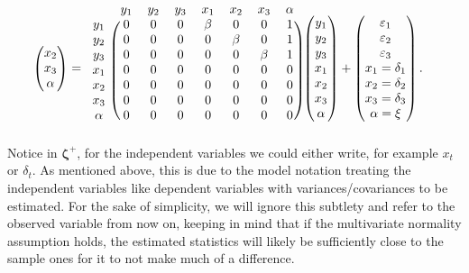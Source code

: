 \documentclass[
  12pt,
  a4paper]{article}
\begin{document}
\begin{align}
\begin{split}
\begin{pmatrix}
x_{2} \\
x_{3} \\
\alpha
\end{pmatrix} & = 
\begin{blockarray}{cccccccc}
 & y_{1} & y_{2} & y_{3} & x_{1} & x_{2} & x_{3} & \alpha \\
 \begin{block}{c(ccccccc)}
 y_{1}  & 0 & 0 & 0 & \beta & 0 & 0 & 1 \\
 y_{2}  & 0 & 0 & 0 & 0 & \beta & 0 & 1\\
 y_{3}  & 0 & 0 & 0 & 0 & 0 & \beta & 1 \\ 
 x_{1}  & 0 & 0 & 0 & 0 & 0 & 0 & 0 \\
 x_{2}  & 0 & 0 & 0 & 0 & 0 & 0 & 0 \\
 x_{3}  & 0 & 0 & 0 & 0 & 0 & 0 & 0 \\
 \alpha & 0 & 0 & 0 & 0 & 0 & 0 & 0 \\
 \end{block}
\end{blockarray}
\begin{pmatrix}
y_{1} \\
y_{2} \\
y_{3} \\
x_{1} \\
x_{2} \\
x_{3} \\
\alpha
\end{pmatrix} + 
\begin{pmatrix}
\varepsilon_{1} \\
\varepsilon_{2} \\
\varepsilon_{3} \\
x_{1} = \delta_{1} \\
x_{2} = \delta_{2} \\
x_{3} = \delta_{3} \\
\alpha = \xi \\
\end{pmatrix}. 
\end{split} \label{eq:eta}
\end{align} Notice in \(\bm{\zeta}^{+}\), for the independent variables
we could either write, for example \(x_{t}\) or \(\delta_{t}\). As
mentioned above, this is due to the model notation treating the
independent variables like dependent variables with
variances/covariances to be estimated. For the sake of simplicity, we
will ignore this subtlety and refer to the observed variable from now
on, keeping in mind that if the multivariate normality assumption holds,
the estimated statistics will likely be sufficiently close to the sample
ones for it to not make much of a difference.
\end{document}
